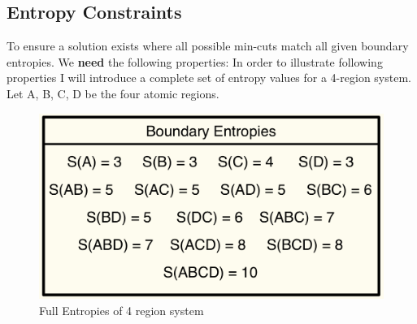 \documentclass[12pt]{article}
\begin{document}
\subsection{Entropy Constraints}
To ensure a solution exists where all possible min-cuts match all given boundary entropies. We \textbf{need} the following properties:
In order to illustrate following properties I will introduce a complete set of entropy values for a 4-region system. Let A, B, C, D be the four atomic regions.

\begin{figure}[htbp]
    \centering
    \includegraphics[width=.7\textwidth, height=.22\textheight]{values.jpeg}  %
    \caption{Full Entropies of 4 region system}
\end{figure}

\newpage
\end{document}
